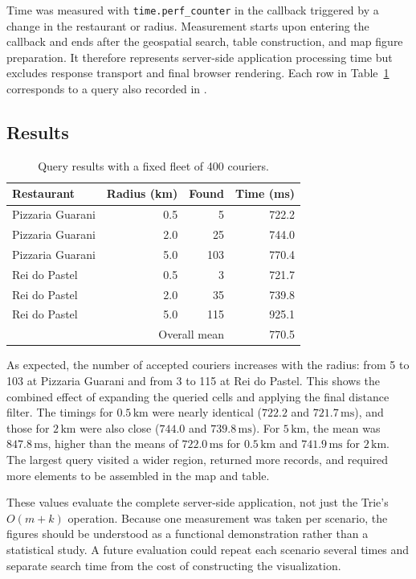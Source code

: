 \documentclass[12pt,a4paper]{article}
\begin{document}
Time was measured with \texttt{time.perf\_counter} in the callback triggered by
a change in the restaurant or radius. Measurement starts upon entering the
callback and ends after the geospatial search, table construction, and map
figure preparation. It therefore represents server-side application processing
time but excludes response transport and final browser rendering. Each row in
Table~\ref{tab:experiments} corresponds to a query also recorded in
.

\subsection{Results}

\begin{table}[htbp]
\centering
\small
\caption{Query results with a fixed fleet of 400 couriers.}
\label{tab:experiments}
\begin{tabular}{@{}lrrr@{}}
\toprule
Restaurant & Radius (km) & Found & Time (ms) \\
\midrule
Pizzaria Guarani & 0.5 & 5   & 722.2 \\
Pizzaria Guarani & 2.0 & 25  & 744.0 \\
Pizzaria Guarani & 5.0 & 103 & 770.4 \\
Rei do Pastel    & 0.5 & 3   & 721.7 \\
Rei do Pastel    & 2.0 & 35  & 739.8 \\
Rei do Pastel    & 5.0 & 115 & 925.1 \\
\midrule
\multicolumn{3}{r}{Overall mean} & 770.5 \\
\bottomrule
\end{tabular}
\end{table}

As expected, the number of accepted couriers increases with the radius: from 5
to 103 at Pizzaria Guarani and from 3 to 115 at Rei do Pastel. This shows the
combined effect of expanding the queried cells and applying the final distance
filter. The timings for $0.5\,\mathrm{km}$ were nearly identical
($722.2$ and $721.7\,\mathrm{ms}$), and those for $2\,\mathrm{km}$ were also
close ($744.0$ and $739.8\,\mathrm{ms}$). For $5\,\mathrm{km}$, the mean was
$847.8\,\mathrm{ms}$, higher than the means of $722.0\,\mathrm{ms}$ for
$0.5\,\mathrm{km}$ and $741.9\,\mathrm{ms}$ for $2\,\mathrm{km}$. The largest
query visited a wider region, returned more records, and required more elements
to be assembled in the map and table.

These values evaluate the complete server-side application, not just the
Trie's $O(m+k)$ operation. Because one measurement was taken per scenario, the
figures should be understood as a functional demonstration rather than a
statistical study. A future evaluation could repeat each scenario several
times and separate search time from the cost of constructing the visualization.
\end{document}
